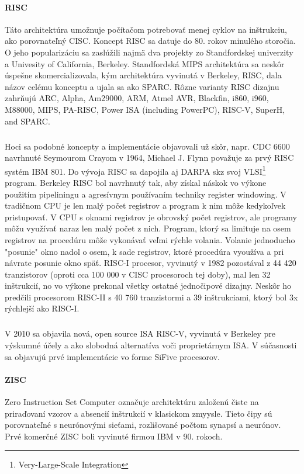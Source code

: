 \documentclass[11pt,a4paper]{report}
\begin{document}
\paragraph{RISC} Táto architektúra umožnuje počítačom potrebovať menej cyklov na inštrukciu, ako porovnateľný CISC. Koncept RISC sa datuje do 80. rokov minulého storočia. O jeho popularizáciu sa zaslúžili najmä dva projekty zo Standfordskej univerzity a Univesity of California, Berkeley. Standfordská MIPS architektúra sa neskôr úspešne skomercializovala, kým architektúra vyvinutá v Berkeley, RISC, dala názov celému konceptu a ujala sa ako SPARC. Rôzne varianty RISC dizajnu zahrňujú  ARC, Alpha, Am29000, ARM, Atmel AVR, Blackfin, i860, i960, M88000, MIPS, PA-RISC, Power ISA (including PowerPC), RISC-V, SuperH, and SPARC.

\subparagraph{} Hoci sa podobné koncepty a implementácie objavovali už skôr, napr. CDC 6600 navrhnuté Seymourom Crayom v 1964, Michael J. Flynn považuje za prvý RISC systém IBM 801. Do vývoja RISC sa dapojila aj DARPA skz svoj VLSI\footnote{Very-Large-Scale Integration} program. Berkeley RISC bol navrhnutý tak, aby získal náskok vo výkone použitím pipeliningu a agresívnym používaním techniky register windowing. V tradičnom CPU je len malý počet registrov a program k nim môže kedykoľvek pristupovať. V CPU s oknami registrov je obrovský počet registrov, ale programy môžu využívať naraz len malý počet z nich. Program, ktorý sa limituje na osem registrov na procedúru môže vykonávať veľmi rýchle volania. Volanie jednoducho "posunie" okno nadol o osem, k sade registrov, ktoré procedúra vyoužíva a pri návrate posunie okno späť. RISC-I procesor, vyvinutý v 1982 pozostával z 44 420 tranzistorov (oproti cca 100 000 v CISC procesoroch tej doby), mal len 32 inštrukcií, no vo výkone prekonal všetky ostatné jednočipové dizajny. Neskôr ho predčili procesorom RISC-II s 40 760 tranzistormi a 39 inštrukciami, ktorý bol 3x rýchlejší ako RISC-I.

\subparagraph{} V 2010 sa objavila nová, open source ISA RISC-V, vyvinutá v Berkeley pre výskumné účely a ako slobodná alternatíva voči proprietárnym ISA. V súčasnosti sa objavujú prvé implementácie vo forme SiFive procesorov.


\paragraph{ZISC} Zero Instruction Set Computer označuje architektúru založenú čiste na priraďovaní vzorov a absencií inštrukcií v klasickom zmyysle. Tieto čipy sú porovnateľné s neurónovými sieťami, rozlišované počtom synapsí a neurónov. Prvé komerčné ZISC boli vyvinuté firmou IBM v 90. rokoch.
\end{document}
